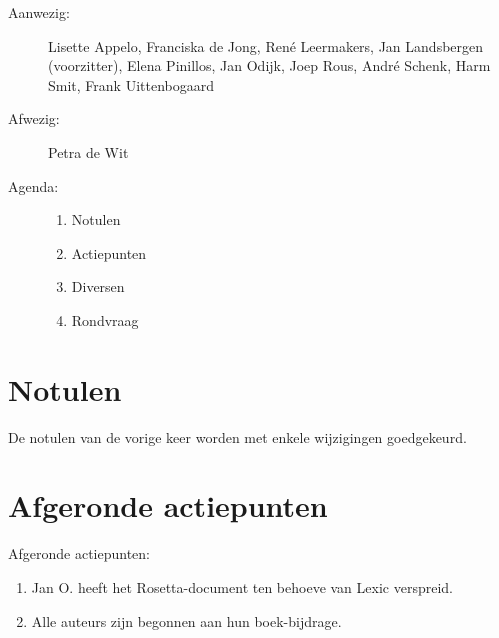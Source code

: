 
   \RosSupersedes{-}
   \MakeRosTitle
%
%
\begin{description}
\item[Aanwezig:] Lisette Appelo,
Franciska de Jong, Ren\'{e} Leermakers,  
                 Jan Landsbergen (voorzitter),   
                 Elena Pinillos, 
                 Jan Odijk, 
                 Joep Rous,
                 Andr\'{e} Schenk,
                 Harm Smit,
                 Frank Uittenbogaard 
                  
                  

\item[Afwezig:]  
Petra de Wit

\item[Agenda:]\mbox{}
  \begin{enumerate}
  \item Notulen
  \item Actiepunten
  \item Diversen
  \item Rondvraag
  \end{enumerate}
\end{description}

\section{Notulen}
De notulen van de vorige keer worden met enkele wijzigingen goedgekeurd.

\section{Afgeronde actiepunten}

Afgeronde actiepunten:
\begin{enumerate}
\item Jan O. heeft het Rosetta-document ten behoeve van Lexic verspreid.
\item Alle auteurs zijn begonnen aan hun boek-bijdrage.
\end{enumerate}

